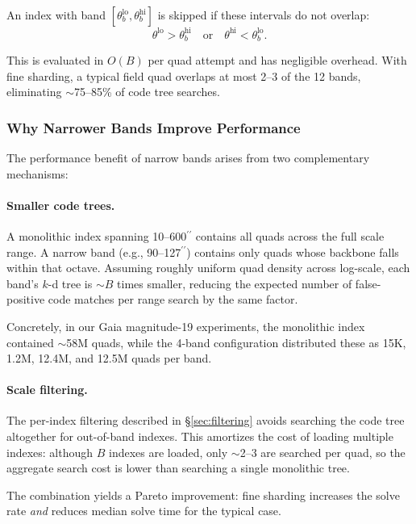 \documentclass[twocolumn, 10pt]{article}
\newcommand{\arcsec}{\ensuremath{^{\prime\prime}}}
\begin{document}
An index with band $[\theta_b^{\text{lo}}, \theta_b^{\text{hi}}]$ is
skipped if these intervals do not overlap:
\begin{equation}
    \theta^{\text{lo}} > \theta_b^{\text{hi}} \quad \text{or} \quad
    \theta^{\text{hi}} < \theta_b^{\text{lo}}.
\end{equation}

This is evaluated in $O(B)$ per quad attempt and has negligible overhead.
With fine sharding, a typical field quad overlaps at most 2--3 of the
12 bands, eliminating $\sim$75--85\% of code tree searches.

\subsubsection{Why Narrower Bands Improve Performance} \label{sec:why}

The performance benefit of narrow bands arises from two complementary
mechanisms:

\paragraph{Smaller code trees.}
A monolithic index spanning 10--600\arcsec{} contains all quads across
the full scale range. A narrow band (e.g., 90--127\arcsec) contains
only quads whose backbone falls within that octave. Assuming roughly
uniform quad density across log-scale, each band's $k$-d tree is
$\sim B$ times smaller, reducing the expected number of false-positive
code matches per range search by the same factor.

Concretely, in our Gaia magnitude-19 experiments, the monolithic index
contained $\sim$58M quads, while the 4-band configuration distributed
these as 15K, 1.2M, 12.4M, and 12.5M quads per band.

\paragraph{Scale filtering.}
The per-index filtering described in \S\ref{sec:filtering} avoids
searching the code tree altogether for out-of-band indexes. This
amortizes the cost of loading multiple indexes: although $B$ indexes
are loaded, only $\sim$2--3 are searched per quad, so the aggregate
search cost is lower than searching a single monolithic tree.

The combination yields a Pareto improvement: fine sharding increases
the solve rate \emph{and} reduces median solve time for the typical case.
\end{document}
